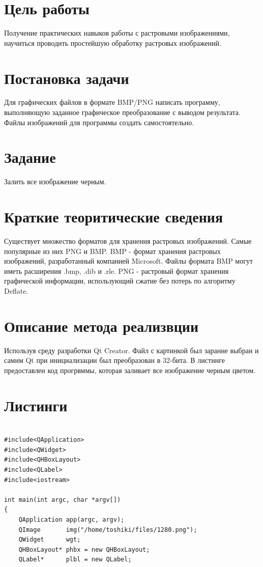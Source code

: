 \documentclass[russian,a4paper,12pt]{scrartcl}
\begin{document}
	\begin{flushleft}
	\setcounter{page}{2}
		\section{Цель работы}
			Получение практических навыков работы с растровыми изображениями, научиться проводить простейшую обработку растровых изображений.
		\section{Постановка задачи}
			Для графических файлов в формате BMP/PNG написать программу, выполняющую заданное графическое преобразование с выводом результата. Файлы изображений для программы создать самостоятельно.
		\section{Задание}
			Залить все изображение черным.
		\section{Краткие теоритические сведения}
			Существует множество форматов для хранения растровых изображений. Самые популярные из них PNG и BMP. BMP - формат хранения растровых изображений, разработанный компанией Microsoft. Файлы формата BMP могут иметь расширения .bmp, .dib и .rle. PNG - растровый формат хранения графической информации, использующий сжатие без потерь по алгоритму Deflate.
		\section{Описание метода реализвции}
			Используя среду разработки Qt Creator. Файл с картинкой был заранне выбран и самим Qt при инициализации был преобразован в 32-бита. В листинге предоставлен код прогрвммы, которая заливает все изображение черным цветом.
		\newpage
		\section{Листинги}
			\begin{verbatim} 

#include<QApplication>
#include<QWidget>
#include<QHBoxLayout>
#include<QLabel>
#include<iostream>

int main(int argc, char *argv[])
{
    QApplication app(argc, argv);
    QImage       img("/home/toshiki/files/1280.png");
    QWidget      wgt;
    QHBoxLayout* phbx = new QHBoxLayout;
    QLabel*      plbl = new QLabel;


\end{verbatim}
\end{flushleft}
\end{document}
